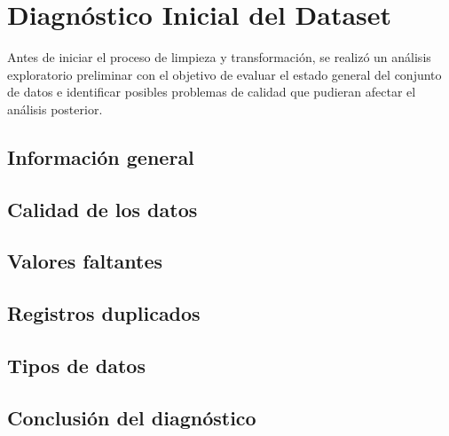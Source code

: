 \chapter{Diagnóstico Inicial del Dataset}

Antes de iniciar el proceso de limpieza y transformación, se realizó un análisis exploratorio preliminar con el objetivo de evaluar el estado general del conjunto de datos e identificar posibles problemas de calidad que pudieran afectar el análisis posterior.


\section{Información general}




\section{Calidad de los datos}




\section{Valores faltantes}




\section{Registros duplicados}




\section{Tipos de datos}




\section{Conclusión del diagnóstico}

